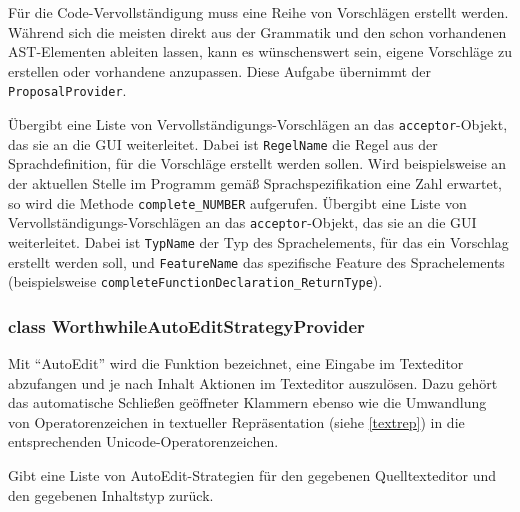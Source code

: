 Für die Code-Vervollständigung muss eine Reihe von Vorschlägen erstellt werden. Während sich die meisten direkt aus der Grammatik und den schon vorhandenen AST-Elementen ableiten lassen, kann es wünschenswert sein, eigene Vorschläge zu erstellen oder vorhandene anzupassen. Diese Aufgabe übernimmt der \texttt{ProposalProvider}.

\begin{description}
	 Übergibt eine Liste von Vervollständigungs-Vorschlägen an das \texttt{acceptor}-Objekt, das sie an die GUI weiterleitet. Dabei ist \texttt{RegelName} die Regel aus der Sprachdefinition, für die Vorschläge erstellt werden sollen. Wird beispielsweise an der aktuellen Stelle im Programm gemäß Sprachspezifikation eine Zahl erwartet, so wird die Methode \texttt{complete\_{}NUMBER} aufgerufen.
	Übergibt eine Liste von Vervollständigungs-Vorschlägen an das \texttt{acceptor}-Objekt, das sie an die GUI weiterleitet. Dabei ist \texttt{TypName} der Typ des Sprachelements, für das ein Vorschlag erstellt werden soll, und \texttt{FeatureName} das spezifische Feature des Sprachelements (beispielsweise \texttt{completeFunctionDeclaration\_{}ReturnType}).
\end{description}

\subsubsection{class WorthwhileAutoEditStrategyProvider}

Mit "`AutoEdit"' wird die Funktion bezeichnet, eine Eingabe im Texteditor abzufangen und je nach Inhalt Aktionen im Texteditor auszulösen. Dazu gehört das automatische Schließen geöffneter Klammern ebenso wie die Umwandlung von Operatorenzeichen in textueller Repräsentation (siehe \ref{textrep}) in die entsprechenden Unicode-Operatorenzeichen.

\begin{description}
	Gibt eine Liste von AutoEdit-Strategien für den gegebenen Quelltexteditor und den gegebenen Inhaltstyp zurück.
\end{description}

